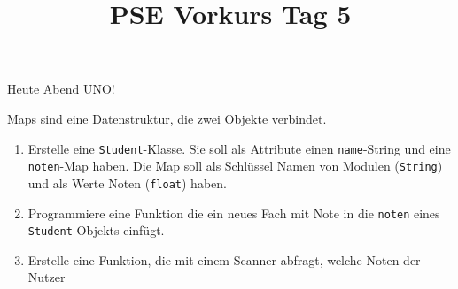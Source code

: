 \documentclass{../../sheet}
\title{PSE Vorkurs Tag 5}
\begin{document}
\maketitle
Heute Abend UNO!

\newpage
{}
Maps sind eine Datenstruktur, die zwei Objekte verbindet. 

\begin{enumerate}
    \item Erstelle eine \texttt{Student}-Klasse. Sie soll als Attribute einen \texttt{name}-String und eine \texttt{noten}-Map haben. Die Map soll als Schlüssel Namen von Modulen (\texttt{String}) und als Werte Noten (\texttt{float}) haben.
    \item Programmiere eine Funktion die ein neues Fach mit Note in die \texttt{noten} eines \texttt{Student} Objekts einfügt. 
    \item Erstelle eine Funktion, die mit einem Scanner abfragt, welche Noten der Nutzer 
\end{enumerate}

\newpage
\end{document}
